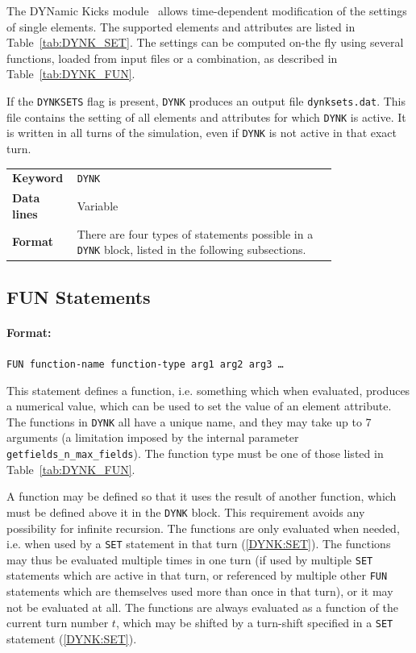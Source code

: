 The DYNamic Kicks module~\cite{DYNKpaper, DYNKpaper2} allows time-dependent modification of the settings of single elements.
The supported elements and attributes are listed in Table~\ref{tab:DYNK_SET}.
The settings can be computed on-the fly using several functions, loaded from input files or a combination, as described in Table~\ref{tab:DYNK_FUN}.

If the \texttt{DYNKSETS} flag is present, \texttt{DYNK} produces an output file \texttt{dynksets.dat}.
This file contains the setting of all elements and attributes for which \texttt{DYNK} is active.
It is written in all turns of the simulation, even if \texttt{DYNK} is not active in that exact turn.

\bigskip
\begin{tabular}{@{}lp{0.8\linewidth}}
    \textbf{Keyword}    & \texttt{DYNK}\index{DYNK} \\
    \textbf{Data lines} & Variable \\
    \textbf{Format}     & There are four types of statements possible in a \texttt{DYNK} block, listed in the following subsections.\\
\end{tabular}

\bigskip

\subsection{FUN Statements} \label{DYNK:FUN}

\paragraph{Format:}
\texttt{FUN function-name function-type arg1 arg2 arg3 \ldots}

\bigskip
This statement defines a function, i.e. something which when evaluated, produces a numerical value, which can be used to set the value of an element attribute.
The functions in \texttt{DYNK} all have a unique name, and they may take up to 7 arguments (a limitation imposed by the internal parameter \texttt{getfields\_n\_max\_fields}).
The function type must be one of those listed in Table~\ref{tab:DYNK_FUN}.

A function may be defined so that it uses the result of another function, which must be defined above it in the \texttt{DYNK} block.
This requirement avoids any possibility for infinite recursion.
The functions are only evaluated when needed, i.e. when used by a \texttt{SET} statement in that turn (\ref{DYNK:SET}).
The functions may thus be evaluated multiple times in one turn (if used by multiple \texttt{SET} statements which are active in that turn, or referenced by multiple other \texttt{FUN} statements which are themselves used more than once in that turn), or it may not be evaluated at all.
The functions are always evaluated as a function of the current turn number $t$, which may be shifted by a turn-shift specified in a \texttt{SET} statement (\ref{DYNK:SET}).

